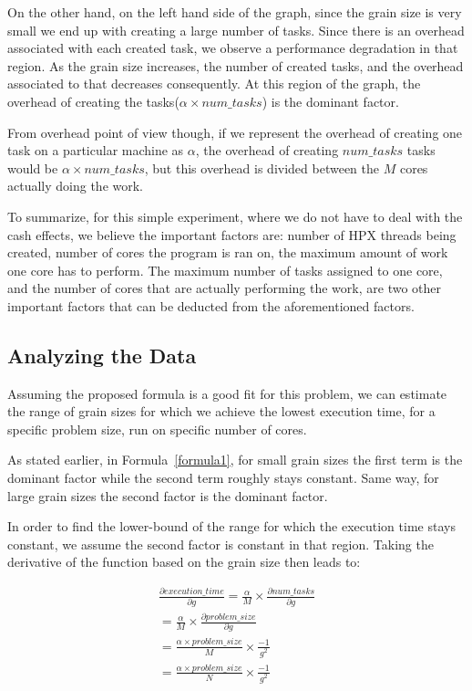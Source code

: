 On the other hand, on the left hand side of the graph, since the grain size is very small we end up with creating a large number of tasks. Since there is an overhead associated with each created task, we observe a performance degradation in that region. As the grain size increases, the number of created tasks, and the overhead associated to that decreases consequently. At this region of the graph, the overhead of creating the tasks($\alpha\times{num\_{tasks}}$) is the dominant factor.   





From overhead point of view though, if we represent the overhead of creating one task on a particular machine as $\alpha$, the overhead of creating $num\_{tasks}$ tasks would be $\alpha\times{num\_{tasks}}$, but this overhead is divided between the $M$ cores actually doing the work. 

To summarize, for this simple experiment, where we do not have to deal with the cash effects, we believe the important factors are: number of HPX threads being created, number of cores the program is ran on, the maximum amount of work one core has to perform. The maximum number of tasks assigned to one core, and the number of cores that are actually performing the work, are two other important factors that can be deducted from the aforementioned factors. 

\vspace{\baselineskip}
\subsection{Analyzing the Data}
Assuming the proposed formula is a good fit for this problem, we can estimate the range of grain sizes for which we achieve the lowest execution time, for a specific problem size, run on specific number of cores.

As stated earlier, in Formula~\ref{formula1}, for small grain sizes the first term is the dominant factor while the second term roughly stays constant. Same way, for large grain sizes the second factor is the dominant factor. 

In order to find the lower-bound of the range for which the execution time stays constant, we assume the second factor is constant in that region. Taking the derivative of the function based on the grain size then leads to:

 
\begin{equation}\label{formula3}
\begin{aligned}
\frac{\partial execution\_{time}}{\partial g} = \frac{\alpha}{M}\times{\frac{\partial num\_{tasks}}{\partial g}} \\
=\frac{\alpha}{M}\times\frac{\partial problem\_{size}}{\partial g} \\
=\frac{\alpha\times{problem\_{size}}}{M}\times{\frac{-1}{g^2}}
\\
=\frac{\alpha\times{problem\_{size}}}{N}\times{\frac{-1}{g^2}}
\end{aligned}
\end{equation}

